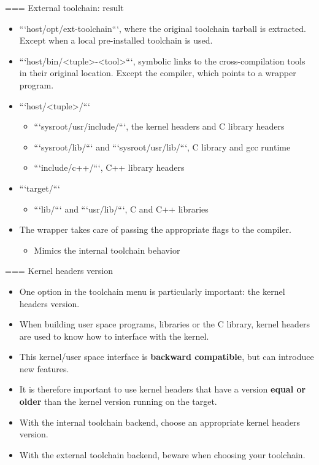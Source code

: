 === External toolchain: result
  \begin{itemize}
  \item ```host/opt/ext-toolchain```, where the original toolchain
    tarball is extracted. Except when a local pre-installed toolchain
    is used.
  \item ```host/bin/<tuple>-<tool>```, symbolic links to the
    cross-compilation tools in their original location. Except the
    compiler, which points to a wrapper program.
  \item ```host/<tuple>/```
    \begin{itemize}
    \item ```sysroot/usr/include/```, the kernel headers and C
      library headers
    \item ```sysroot/lib/``` and ```sysroot/usr/lib/```, C library and
      gcc runtime
    \item ```include/c++/```, C++ library headers
    \end{itemize}
  \item ```target/```
    \begin{itemize}
    \item ```lib/``` and ```usr/lib/```, C and C++ libraries
    \end{itemize}
  \item The wrapper takes care of passing the appropriate flags to the
    compiler.
    \begin{itemize}
    \item Mimics the internal toolchain behavior
    \end{itemize}
  \end{itemize}


=== Kernel headers version
  \begin{itemize}
  \item One option in the toolchain menu is particularly important:
    the kernel headers version.
  \item When building user space programs, libraries or the C library,
    kernel headers are used to know how to interface with the kernel.
  \item This kernel/user space interface is {\bf backward compatible},
    but can introduce new features.
  \item It is therefore important to use kernel headers that have a
    version {\bf equal or older} than the kernel version running on
    the target.
  \item With the internal toolchain backend, choose an appropriate
    kernel headers version.
  \item With the external toolchain backend, beware when choosing your
    toolchain.
  \end{itemize}


